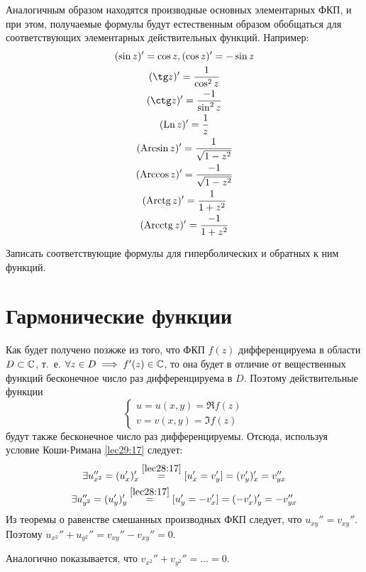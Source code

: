 \documentclass[../../main.tex]{subfiles}
\begin{document}
Аналогичным образом находятся производные основных элементарных ФКП, 
и при этом, получаемые формулы будут естественным образом обобщаться для
соответствующих элементарных действительных функций. Например:
\[
\begin{gathered}
(\sin z)' = \cos z, (\cos z)' = -\sin z\\
(\tg z)' = \dfrac{1}{\cos^2 z}\\ 
(\ctg z)' = \dfrac{-1}{\sin^2 z}\\
(\Ln z)' = \dfrac{1}{z}\\
(\Arcsin z)' = \dfrac{1}{\sqrt{1 - z^2}}\\
(\Arccos z)' = \dfrac{-1}{\sqrt{1 - z^2}}\\
(\Arctg z)' = \dfrac{1}{1 + z^2}\\
(\Arcctg z)' = \dfrac{-1}{1 + z^2}
\end{gathered}
\]
\begin{exc}
	Записать соответствующие формулы для гиперболических 
	и обратных к ним функций.
\end{exc}

\section{Гармонические функции}

Как будет получено позжже из того, что ФКП $ f(z) $ дифференцируема в области
$ D \subset \mathbb{C} $, т.~е. $ \forall z \in D \implies f'(z) \in \mathbb{C} $, то она 
будет
в отличие от вещественных функций бесконечное число раз дифференцируема в $ D 
$.
Поэтому действительные функции 
\[
\begin{cases}
	u = u(x, y) = \Re f(z)\\
	v = v(x, y) = \Im f(z)
\end{cases}
\]
будут также бесконечное число раз дифференцируемы. Отсюда, используя условие
Коши-Римана \eqref{lec29:17} следует:
\[
\begin{gathered}
\exists u_{x^2}'' = (u_x')_x' 
\stackrel{\eqref{lec28:17}}{=}
[u_x' = v_y'] = (v_y')_x' = v_{yx}''\\
\exists u_{y^2}'' = (u_y')_y' 
\stackrel{\eqref{lec28:17}}{=}
[u_y' = -v_x'] = (-v_x')_y' = -v_{yx}''\\
\end{gathered}
\]
Из теоремы о равенстве смешанных производных ФКП следует, что 
$ u_{xy}'' = v_{xy}'' $. Поэтому $ u_{x^2}'' + u_{y^2}'' = v_{xy}'' - v_{xy}'' 
= 0 $.

Аналогично показывается, что $ v_{x^2}'' + v_{y^2}'' = \dots = 0 $.
\end{document}
